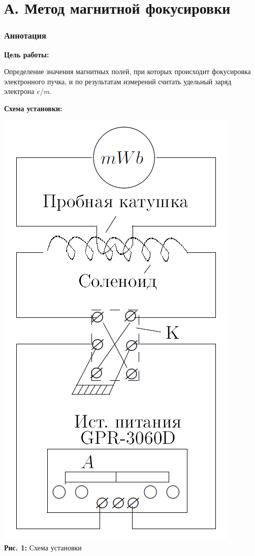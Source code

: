 \documentclass[12pt,a4paper]{scrartcl}
\begin{document}
	\part*{А. Метод магнитной фокусировки}	
	
	\section{Аннотация}
	
	\textbf{Цель работы: }
	
	Определение значения магнитных полей, при которых происходит фокусировка электронного пучка, и по результатам измерений считать удельный заряд электрона $e/m$.	
	
	\textbf{Схема установки:}
	\begin{center}
		\includegraphics[scale=0.4]{PIC_1.png}
		\\\textbf{Рис. 1:} Схема установки
	\end{center}
	
\end{document}
